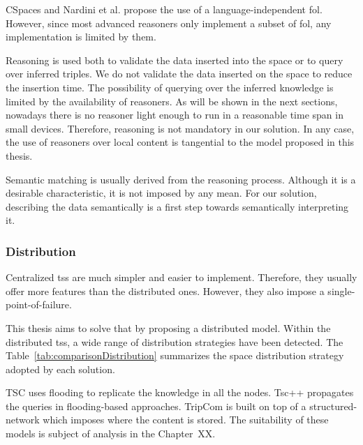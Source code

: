 CSpaces and Nardini et al. propose the use of a language-independent \ac{fol}.
However, since most advanced reasoners only implement a subset of \ac{fol}, any implementation is limited by them. %

Reasoning is used both to validate the data inserted into the space or to query over inferred triples.
We do not validate the data inserted on the space to reduce the insertion time.
The possibility of querying over the inferred knowledge is limited by the availability of reasoners.
As will be shown in the next sections, nowadays there is no reasoner light enough to run in a reasonable time span in small devices.
Therefore, reasoning is not mandatory in our solution.
In any case, the use of reasoners over local content is tangential to the model proposed in this thesis.

Semantic matching is usually derived from the reasoning process.
Although it is a desirable characteristic, it is not imposed by any mean.
For our solution, describing the data semantically is a first step towards semantically interpreting it.






\subsubsection{Distribution}

Centralized \aclp{ts} are much simpler and easier to implement.
Therefore, they usually offer more features than the distributed ones.
However, they also impose a single-point-of-failure.

This thesis aims to solve that by proposing a distributed model.
Within the distributed \aclp{ts}, a wide range of distribution strategies have been detected.
The Table~\ref{tab:comparisonDistribution} summarizes the space distribution strategy adopted by each solution.

TSC uses flooding to replicate the knowledge in all the nodes.
Tsc++ propagates the queries in flooding-based approaches.
TripCom is built on top of a structured-network which imposes where the content is stored.
The suitability of these models is subject of analysis in the Chapter~XX.

